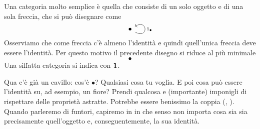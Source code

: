 %

\begin{esempio}\label{esempio:CatTerminal}
Una categoria molto semplice è quella che consiste di un solo oggetto e di una sola freccia, che si può disegnare come
\[\begin{tikzcd}
\bullet \ar[out=-30,in=30,loop,looseness=7,overlay,"\id_\bullet",swap]
\end{tikzcd}\]
Osserviamo che come freccia c'è almeno l'identità e quindi quell'unica freccia deve essere l'identità. Per questo motivo il precedente disegno si riduce al più minimale
\[\bullet\]
Una siffatta categoria si indica con \(\mathbf{1}\).
\end{esempio}

\begin{nota}
Qua c'è già un cavillo: cos'è \(\bullet\)? Qualsiasi cosa tu voglia. E poi cosa può essere l'identità su, ad esempio, un fiore? Prendi qualcosa e (importante) imponigli di rispettare delle proprietà astratte. Potrebbe essere benissimo la coppia (\fiore{}, \fiore{}). Quando parleremo di funtori, capiremo in in che senso non importa cosa sia sia precisamente quell'oggetto e, conseguentemente, la sua identità.
\end{nota}

